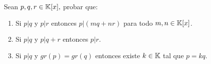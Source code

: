 \item Sean $p,q,r\in\mathbb{K}[x],$ probar que:
    \begin{enumerate}
        \item Si $p|q$ y $p|r$ entonces $p|(mq+nr)$ para todo $m,n\in\mathbb{K}[x]$.
            \begin{mdframed}[style=s]
            
            \end{mdframed}
        \item Si $p|q$ y $p|q+r$ entonces $p|r$.
            \begin{mdframed}[style=s]
            
            \end{mdframed}
        \item Si $p|q$ y $gr(p)=gr(q)$ entonces existe $k\in\mathbb{K}$ tal que $p=kq$.
            \begin{mdframed}[style=s]
            
            \end{mdframed}
    \end{enumerate}
    